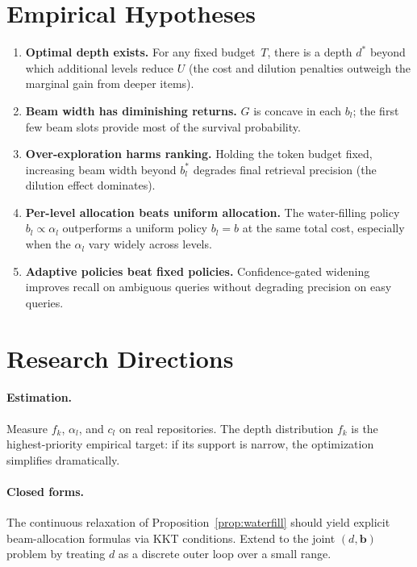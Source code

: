 \documentclass[11pt]{article}
\newcommand{\bvec}{\mathbf{b}}
\theoremstyle{plain}
\begin{document}
\section{Empirical Hypotheses}

\begin{enumerate}[nosep]
  \item \textbf{Optimal depth exists.}
    For any fixed budget~$T$, there is a depth $d^*$ beyond which
    additional levels reduce $U$ (the cost and dilution penalties
    outweigh the marginal gain from deeper items).
  \item \textbf{Beam width has diminishing returns.}
    $G$ is concave in each $b_l$; the first few beam slots provide
    most of the survival probability.
  \item \textbf{Over-exploration harms ranking.}
    Holding the token budget fixed, increasing beam width beyond
    $b_l^*$ degrades final retrieval precision (the dilution effect
    dominates).
  \item \textbf{Per-level allocation beats uniform allocation.}
    The water-filling policy $b_l \propto \alpha_l$ outperforms a
    uniform policy $b_l = b$ at the same total cost, especially when
    the $\alpha_l$ vary widely across levels.
  \item \textbf{Adaptive policies beat fixed policies.}
    Confidence-gated widening improves recall on ambiguous queries
    without degrading precision on easy queries.
\end{enumerate}

\section{Research Directions}

\paragraph{Estimation.}
Measure $f_k$, $\alpha_l$, and $c_l$ on real repositories.  The
depth distribution $f_k$ is the highest-priority empirical target:
if its support is narrow, the optimization simplifies dramatically.

\paragraph{Closed forms.}
The continuous relaxation of Proposition~\ref{prop:waterfill} should
yield explicit beam-allocation formulas via KKT conditions.  Extend
to the joint $(d, \bvec)$ problem by treating $d$ as a discrete outer
loop over a small range.
\end{document}
